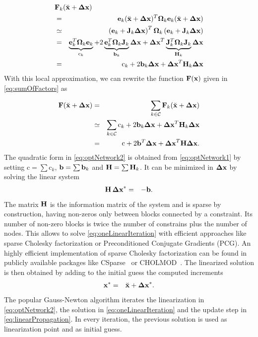 \documentclass[a4paper]{article}
\begin{document}
\vspace{-3.5mm}
{\small
\begin{eqnarray}
\lefteqn{\bF_{k}(\breve{\bx} + \bDeltax) }\\
&=&  \be_{k}(\breve{\bx} + \bDeltax)^T \bOmega_{k} \be_{k}(\breve{\bx} + \bDeltax)  \\
\label{eq:errorQuad1}
             &\simeq& \left(\ec_{k} + \bJ_{k} \bDeltax \right)^T \bOmega_{k} \left(\ec_{k} + \bJ_{k} \bDeltax \right)  \\
\label{eq:errorQuad2}
             &=& \underbrace{\ec_{k}^T \bOmega_{k}\ec_{k}}_{\mathrm{c}_{k}} + 2 \underbrace{\ec_{k}^T \bOmega_{k} \bJ_{k}}_{\bb_{k}} \bDeltax +
 \bDeltax^T \underbrace{\bJ_{k}^T \bOmega_{k}\bJ_{k}}_{\bH_{k}} \bDeltax \\
             &=&\mathrm{c}_{k} + 2 \bb_{k} \bDeltax + \bDeltax^T \bH_{k} \bDeltax
\label{eq:errorQuad}
\end{eqnarray}
}
With this local approximation, we can rewrite the function
$\mathbf{F}(\mathbf{x})$ given in \eqref{eq:sumOfFactors} as

\vspace{-3.5mm}
{\small
\begin{eqnarray}
\mathbf{F}(\breve{\mathbf{x}} + \mathbf{\Delta x}) &=& \sum_{k \in\mathcal{C}} \mathbf{F}_{k}(\breve{\mathbf{x}} + \mathbf{\Delta x})
\label{eq:optNetwork0}\\
                      &\simeq& \sum_{k \in\mathcal{C}} \mathrm{c}_{k} + 2 \mathbf{b}_{k} \mathbf{\Delta x} + \mathbf{\Delta x}^T \mathbf{H}_{k} \mathbf{\Delta x}
\label{eq:optNetwork1}\\
                      &=&\mathrm{c} + 2 \mathbf{b}^T \mathbf{\Delta x} + \mathbf{\Delta x}^T \mathbf{H} \mathbf{\Delta x}.
\label{eq:optNetwork2}
\end{eqnarray}
} The quadratic form in \eqref{eq:optNetwork2} is obtained from
\eqref{eq:optNetwork1} by setting $\mathrm{c}=\sum \mathrm{c}_{k}$,
$\mathbf{b}=\sum \mathbf{b}_{k}$ and $\mathbf{H}=\sum \mathbf{H}_{k}$. It can be minimized in
$\mathbf{\Delta x}$ by solving the linear system
\begin{eqnarray}
       \mathbf{H}\,\mathbf{\Delta x}^* &=& - \mathbf{b}.
\label{eq:oneLinearIteration}
\end{eqnarray}
The matrix $\mathbf{H}$ is the information matrix of the system and is sparse
by construction, having non-zeros only between blocks connected by a
constraint.  Its number of non-zero blocks is twice the number of
constrains plus the number of nodes. This allows to solve
\eqref{eq:oneLinearIteration} with efficient approaches like sparse
Cholesky factorization or Preconditioned Conjugate Gradients (PCG). An
highly efficient implementation of sparse Cholesky factorization can
be found in publicly available packages like CSparse~\cite{csparse} or
CHOLMOD~\cite{cholmod}.  The linearized solution is then obtained by
adding to the initial guess the computed increments
\begin{eqnarray}
  \mathbf{x}^*&=&\breve{\mathbf{x}}+\mathbf{\Delta x}^*.
\label{eq:linearPropagation}
\end{eqnarray}
The popular Gauss-Newton algorithm iterates the linearization in
\eqref{eq:optNetwork2}, the solution in \eqref{eq:oneLinearIteration}
and the update step in \eqref{eq:linearPropagation}. In every
iteration, the previous solution is used as linearization point and as
initial guess.
\end{document}
